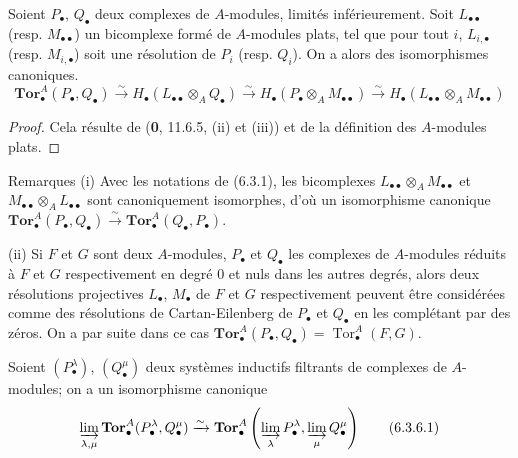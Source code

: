 \begin{proposition}[6.3.4]
Soient $P_\bullet$, $Q_\bullet$ deux complexes de $A$-modules, limités
inférieurement. Soit $L_{\bullet\bullet}$ \textup{(resp. $M_{\bullet\bullet}$)} un
bicomplexe formé de $A$-modules plats, tel que pour tout $i$,
$L_{i,\bullet}$ \textup{(resp. $M_{i,\bullet}$)} soit une résolution de $P_i$
\textup{(resp. $Q_i$)}. On a alors des isomorphismes canoniques.
\[
  \mathbf{Tor}_\bullet^A(P_\bullet,Q_\bullet)
  \xrightarrow{\sim}H_\bullet(L_{\bullet\bullet}\otimes_AQ_\bullet)
  \xrightarrow{\sim}H_\bullet(P_\bullet\otimes_AM_{\bullet\bullet})
  \xrightarrow{\sim}H_\bullet(L_{\bullet\bullet}\otimes_AM_{\bullet\bullet})
  \tag{6.3.4.1}\label{III.6.3.4.1.fr}
\]
\end{proposition}

\begin{proof}
Cela résulte de (\textbf{0}, 11.6.5, (ii) et (iii)) et de la définition des
$A$-modules plats.
\end{proof}

\begin{namedtheorem}[6.3.5]{Remarques}
(i) Avec les notations de (6.3.1), les bicomplexes
$L_{\bullet\bullet}\otimes_A M_{\bullet\bullet}$ et
$M_{\bullet\bullet}\otimes_A L_{\bullet\bullet}$ sont canoniquement
isomorphes, d'où un isomorphisme canonique
$\mathbf{Tor}_\bullet^A(P_\bullet,Q_\bullet)\xrightarrow{\sim}
\mathbf{Tor}_\bullet^A(Q_\bullet,P_\bullet)$.

(ii) Si $F$ et $G$ sont deux $A$-modules, $P_\bullet$ et $Q_\bullet$ les
complexes de $A$-modules réduits à $F$ et $G$ respectivement en degré 0 et
nuls dans les autres degrés, alors deux résolutions projectives $L_\bullet$,
$M_\bullet$ de $F$ et $G$ respectivement peuvent être considérées comme des
résolutions de Cartan-Eilenberg de $P_\bullet$ et $Q_\bullet$ en les
complétant par des zéros. On a par suite dans ce cas
$\mathbf{Tor}_\bullet^A(P_\bullet,Q_\bullet)
=\operatorname{Tor}_\bullet^A(F,G)$.
\end{namedtheorem}

\begin{proposition}[6.3.6]
Soient $(P_\bullet^\lambda)$, $(Q_\bullet^\mu)$ deux systèmes inductifs
filtrants de complexes de $A$-modules; on a un isomorphisme canonique
\[
  \varinjlim_{\lambda,\mu}
  \mathbf{Tor}_\bullet^A(P_\bullet^\lambda,Q_\bullet^\mu)
  \xrightarrow{\sim}
  \mathbf{Tor}_\bullet^A
  \left(\varinjlim_\lambda P_\bullet^\lambda,
        \varinjlim_\mu Q_\bullet^\mu\right)
  \tag{6.3.6.1}\label{III.6.3.6.1.fr}
\]
\end{proposition}

